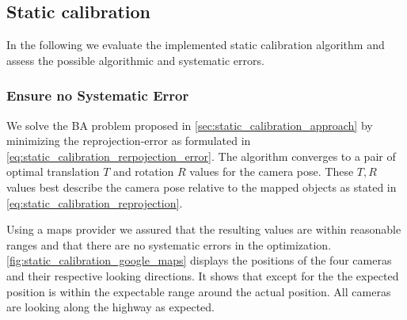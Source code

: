 
\subsection{Static calibration}
In the following we evaluate the implemented static calibration algorithm and assess the possible algorithmic and systematic errors.


\subsubsection{Ensure no Systematic Error}

We solve the BA problem proposed in \autoref{sec:static_calibration_approach} by minimizing the reprojection-error as formulated in \autoref{eq:static_calibration_rerpojection_error}.
The algorithm converges to a pair of optimal translation $T$ and rotation $R$ values for the camera pose.
These $T, R$ values best describe the camera pose relative to the mapped objects as stated in \autoref{eq:static_calibration_reprojection}.

Using a maps provider we assured that the resulting values are within reasonable ranges and that there are no systematic errors in the optimization.
\autoref{fig:static_calibration_google_maps} displays the positions of the four cameras and their respective looking directions. 
It shows that except for the  the expected position is within the expectable range around the actual position.
All cameras are looking along the highway as expected. 



